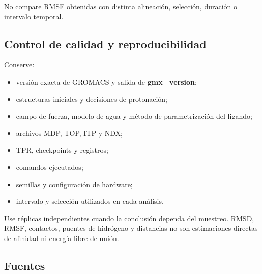\documentclass[
  spanish,
  11pt,
  a4paper]{article}
\providecommand{\tightlist}{%
  \setlength{\itemsep}{0pt}\setlength{\parskip}{0pt}}
\begin{document}
No compare RMSF obtenidas con distinta alineación, selección, duración o
intervalo temporal.

\subsection{Control de calidad y
reproducibilidad}\label{control-de-calidad-y-reproducibilidad}

Conserve:

\begin{itemize}
\tightlist
\item
  versión exacta de GROMACS y salida de \textbf{gmx --version};
\item
  estructuras iniciales y decisiones de protonación;
\item
  campo de fuerza, modelo de agua y método de parametrización del
  ligando;
\item
  archivos MDP, TOP, ITP y NDX;
\item
  TPR, checkpoints y registros;
\item
  comandos ejecutados;
\item
  semillas y configuración de hardware;
\item
  intervalo y selección utilizados en cada análisis.
\end{itemize}

Use réplicas independientes cuando la conclusión dependa del muestreo.
RMSD, RMSF, contactos, puentes de hidrógeno y distancias no son
estimaciones directas de afinidad ni energía libre de unión.

\subsection{Fuentes}\label{fuentes-1}
\end{document}

